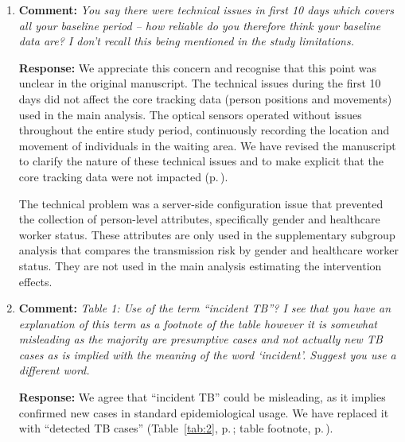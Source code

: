 \documentclass[11pt]{article}
\newcommand{\comment}[1]{\textbf{Comment:} \textit{#1}}
\newcommand{\response}[1]{\textbf{Response:} #1}
\begin{document}
\begin{enumerate}[label=\textbf{R1.\arabic*.}, leftmargin=*]
{\textit{Potential carryover effects.} We appreciate the reviewer's concern that processes may have changed following the interventions. However, we believe that carryover effects were limited for several reasons. First, all infrastructure changes were temporary and removed at the end of the intervention phases. Second, study staff were instructed \underline{not} to continue intervention-related activities after the intervention phases ended. Third, it is unlikely that behavioural changes among clinic attendees persisted as few patients visit the facility multiple times within the relatively short study period. Consistent with these considerations, the modelled Mtb transmission risk adjusted for person-time was higher during the post-intervention baseline compared to the intervention phases, suggesting that the beneficial effects of the interventions diminished once they were removed (Supplementary Figures \ref{fig:S9} and \ref{fig:S10}).}

\item\label{r:1.3} \comment{You say there were technical issues in first 10 days which covers all your baseline period -- how reliable do you therefore think your baseline data are? I don't recall this being mentioned in the study limitations.}

\response{We appreciate this concern and recognise that this point was unclear in the original manuscript. The technical issues during the first 10 days did not affect the core tracking data (person positions and movements) used in the main analysis. The optical sensors operated without issues throughout the entire study period, continuously recording the location and movement of individuals in the waiting area. We have revised the manuscript to clarify the nature of these technical issues and to make explicit that the core tracking data were not impacted (p.\,\pageref{chg:R1.3}).

The technical problem was a server-side configuration issue that prevented the collection of person-level attributes, specifically gender and healthcare worker status. These attributes are only used in the supplementary subgroup analysis that compares the transmission risk by gender and healthcare worker status. They are not used in the main analysis estimating the intervention effects.}

\item\label{r:1.4} \comment{Table 1: Use of the term ``incident TB''? I see that you have an explanation of this term as a footnote of the table however it is somewhat misleading as the majority are presumptive cases and not actually new TB cases as is implied with the meaning of the word `incident'. Suggest you use a different word.}

\response{We agree that ``incident TB'' could be misleading, as it implies confirmed new cases in standard epidemiological usage. We have replaced it with ``detected TB cases'' (Table~\ref{tab:2}, p.\,\pageref{chg:R1.4a}; table footnote, p.\,\pageref{chg:R1.4b}).}

\end{enumerate}
\end{document}

